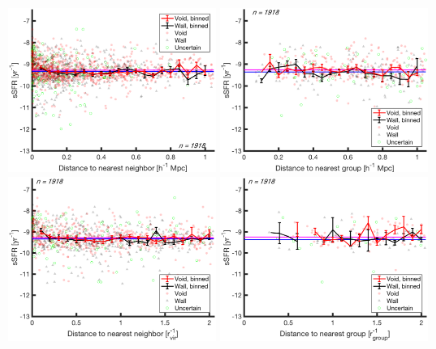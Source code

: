 \begin{figure}
    \includegraphics[width=0.49\textwidth]{Images/smallScaleEnvironment/1sig_dwarf_I06relations_absDist_sSFR}
    \includegraphics[width=0.49\textwidth]{Images/smallScaleEnvironment/1sig_dwarf_I06relations_groupAbsDist_sSFR}
    \includegraphics[width=0.49\textwidth]{Images/smallScaleEnvironment/1sig_dwarf_I06relations_virDist_sSFR}
    \includegraphics[width=0.49\textwidth]{Images/smallScaleEnvironment/1sig_dwarf_I06relations_groupRDist_sSFR}

\end{figure}
